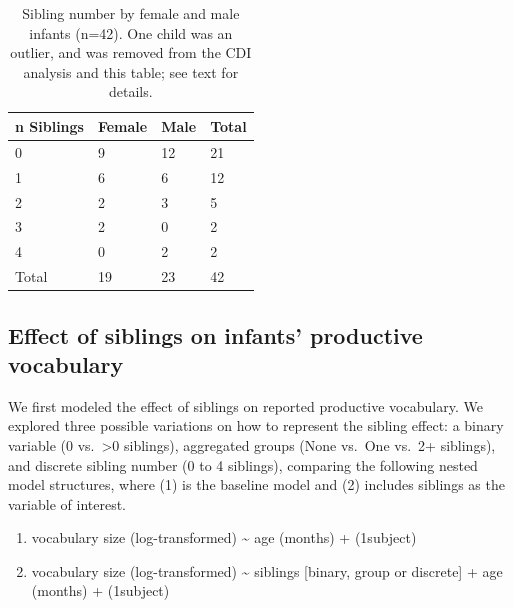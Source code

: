 \documentclass[
  man,mask,floatsintext]{apa6}
\providecommand{\tightlist}{%
  \setlength{\itemsep}{0pt}\setlength{\parskip}{0pt}}
\begin{document}
\begin{table}[tbp]

\begin{center}
\begin{threeparttable}

\caption{\label{tab:table-sibling-number}Sibling number by female and male infants (n=42). One child was an outlier, and was removed from the CDI analysis and this table; see text for details.}

\small{

\begin{tabular}{llll}
\toprule
n Siblings & \multicolumn{1}{c}{Female} & \multicolumn{1}{c}{Male} & \multicolumn{1}{c}{Total}\\
\midrule
0 & 9 & 12 & 21\\
1 & 6 & 6 & 12\\
2 & 2 & 3 & 5\\
3 & 2 & 0 & 2\\
4 & 0 & 2 & 2\\
Total & 19 & 23 & 42\\
\bottomrule
\end{tabular}

}

\end{threeparttable}
\end{center}

\end{table}

\hypertarget{effect-of-siblings-on-infants-productive-vocabulary}{%
\subsection{Effect of siblings on infants' productive vocabulary}\label{effect-of-siblings-on-infants-productive-vocabulary}}

We first modeled the effect of siblings on reported productive vocabulary. We explored three possible variations on how to represent the sibling effect: a binary variable (0 vs.~\textgreater0 siblings), aggregated groups (None vs.~One vs.~2+ siblings), and discrete sibling number (0 to 4 siblings), comparing the following nested model structures, where (1) is the baseline model and (2) includes siblings as the variable of interest.

\begin{enumerate}
\def\labelenumi{\arabic{enumi}.}
\tightlist
\item
  vocabulary size (log-transformed) \textasciitilde{} age (months) + (1\textbar subject)
\item
  vocabulary size (log-transformed) \textasciitilde{} siblings {[}binary, group or discrete{]} + age (months) + (1\textbar subject)
\end{enumerate}
\end{document}
